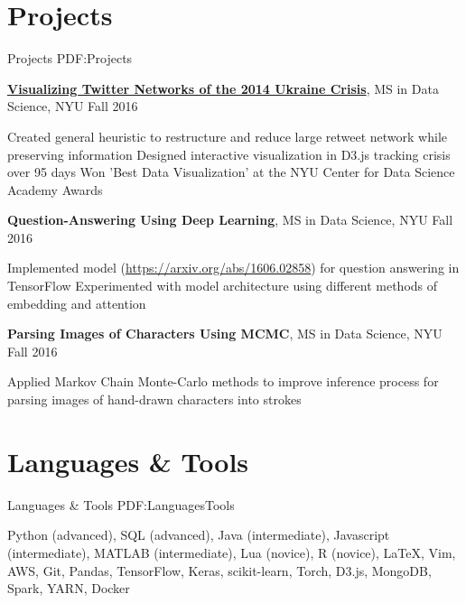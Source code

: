 \documentclass[letterpaper,9.5pt,oneside]{article}
\newcommand{\CVNote}{CV compiled on {\today}}
\begin{document}
\begin{body}
\BigGap



\section
{Projects}
{Projects}
{PDF:Projects}

\href{http://cims.nyu.edu/~ceb545/LaSNe/viz/graph_line.html}
{\textbf{Visualizing Twitter Networks of the 2014 Ukraine Crisis}},
MS in Data Science, NYU \hfill
Fall 2016

\GapNoBreak
\begin{detail}
\BulletItem
Created general heuristic to restructure and reduce large retweet network while preserving information
\BulletItem Designed interactive visualization in D3.js tracking crisis over 95 days 
\BulletItem Won 'Best Data Visualization' at the NYU Center for Data Science Academy Awards
\end{detail}

\BigGap

\textbf{Question-Answering Using Deep Learning},
MS in Data Science, NYU \hfill
Fall 2016

\GapNoBreak
\begin{detail}
\BulletItem
Implemented model (\url{https://arxiv.org/abs/1606.02858}) for question answering in TensorFlow
\BulletItem Experimented with model architecture using different methods of embedding and attention
\end{detail}

\BigGap

\textbf{Parsing Images of Characters Using MCMC},
MS in Data Science, NYU \hfill
Fall 2016

\GapNoBreak
\begin{detail}
\BulletItem
Applied Markov Chain Monte-Carlo methods to improve inference process for parsing images of hand-drawn characters into strokes
\end{detail}


\section
{Languages \& Tools}
{Languages \& Tools}
{PDF:LanguagesTools}

Python (advanced), SQL (advanced), Java (intermediate), Javascript (intermediate), MATLAB (intermediate), Lua (novice), R (novice), LaTeX, Vim, AWS, Git, Pandas, TensorFlow, Keras, scikit-learn, Torch, D3.js, MongoDB, Spark, YARN, Docker


\end{body}
\label{LastPage}%
\end{document}
